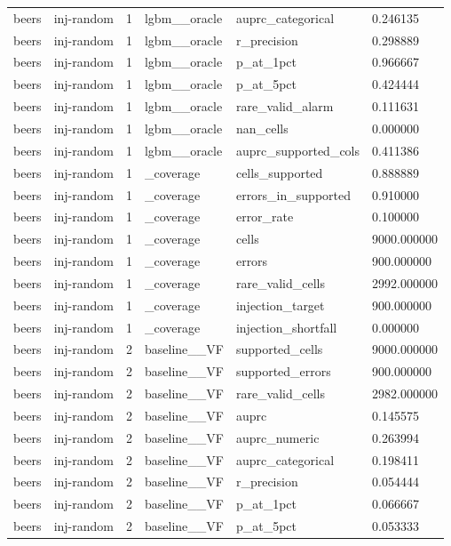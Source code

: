 \begin{tabular}{llllll}
beers & inj-random & 1 & lgbm\_\_oracle & auprc\_categorical & 0.246135 \\
beers & inj-random & 1 & lgbm\_\_oracle & r\_precision & 0.298889 \\
beers & inj-random & 1 & lgbm\_\_oracle & p\_at\_1pct & 0.966667 \\
beers & inj-random & 1 & lgbm\_\_oracle & p\_at\_5pct & 0.424444 \\
beers & inj-random & 1 & lgbm\_\_oracle & rare\_valid\_alarm & 0.111631 \\
beers & inj-random & 1 & lgbm\_\_oracle & nan\_cells & 0.000000 \\
beers & inj-random & 1 & lgbm\_\_oracle & auprc\_supported\_cols & 0.411386 \\
beers & inj-random & 1 & \_coverage & cells\_supported & 0.888889 \\
beers & inj-random & 1 & \_coverage & errors\_in\_supported & 0.910000 \\
beers & inj-random & 1 & \_coverage & error\_rate & 0.100000 \\
beers & inj-random & 1 & \_coverage & cells & 9000.000000 \\
beers & inj-random & 1 & \_coverage & errors & 900.000000 \\
beers & inj-random & 1 & \_coverage & rare\_valid\_cells & 2992.000000 \\
beers & inj-random & 1 & \_coverage & injection\_target & 900.000000 \\
beers & inj-random & 1 & \_coverage & injection\_shortfall & 0.000000 \\
beers & inj-random & 2 & baseline\_\_VF & supported\_cells & 9000.000000 \\
beers & inj-random & 2 & baseline\_\_VF & supported\_errors & 900.000000 \\
beers & inj-random & 2 & baseline\_\_VF & rare\_valid\_cells & 2982.000000 \\
beers & inj-random & 2 & baseline\_\_VF & auprc & 0.145575 \\
beers & inj-random & 2 & baseline\_\_VF & auprc\_numeric & 0.263994 \\
beers & inj-random & 2 & baseline\_\_VF & auprc\_categorical & 0.198411 \\
beers & inj-random & 2 & baseline\_\_VF & r\_precision & 0.054444 \\
beers & inj-random & 2 & baseline\_\_VF & p\_at\_1pct & 0.066667 \\
beers & inj-random & 2 & baseline\_\_VF & p\_at\_5pct & 0.053333 \\

\end{tabular}
